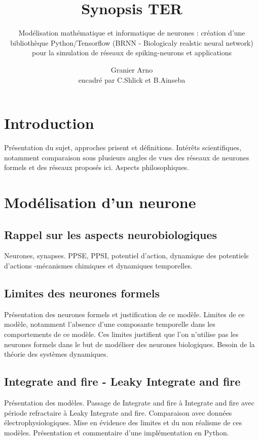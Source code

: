 \documentclass[12pt]{scrartcl}
\title{Synopsis TER}
\subtitle{Modélisation mathématique et informatique de neurones : création d'une bibliothèque Python/Tensorflow (BRNN - Biologicaly realstic neural network) pour la simulation de réseaux de spiking-neurons et applications}
\author{Granier Arno \\ encadré par C.Shlick et B.Ainseba}
\begin{document}
\maketitle

\tableofcontents

\pagebreak

\section{Introduction} Présentation du sujet, approches prisent et définitions. Intérêts scientifiques, notamment comparaison sous plusieurs angles de vues des réseaux de neurones formels et des réseaux proposés ici. Aspects philosophiques.


\section{Modélisation d'un neurone}\label{mod1}

\subsection{Rappel sur les aspects neurobiologiques} Neurones, synapses. PPSE, PPSI, potentiel d'action, dynamique des potentiels d'actions -mécanismes chimiques et dynamiques temporelles.

\subsection{Limites des neurones formels} Présentation des neurones formels et justification de ce modèle. Limites de ce modèle, notamment l'absence d'une composante temporelle dans les comportements de ce modèle. Ces limites justifient que l'on n'utilise pas les neurones formels dans le but de modéliser des neurones biologiques. Besoin de la théorie des systèmes dynamiques.

\subsection{Integrate and fire - Leaky Integrate and fire} Présentation des modèles. Passage de Integrate and fire à Integrate and fire avec période refractaire à Leaky Integrate and fire. Comparaison avec données électrophysiologiques. Mise en évidence des limites et du non réalisme de ces modèles. Présentation et commentaire d'une implémentation en Python.
\end{document}
